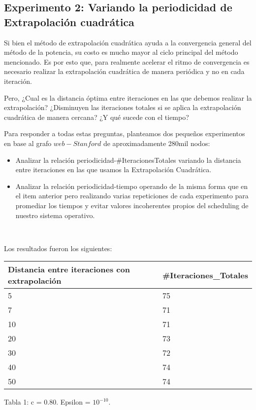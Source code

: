 \subsection{Experimento 2: Variando la periodicidad de Extrapolaci\'on cuadr\'atica}

Si bien el m\'etodo de extrapolaci\'on cuadr\'atica ayuda a la convergencia general del m\'etodo de la potencia, su costo es mucho mayor al ciclo principal del m\'etodo mencionado. Es por esto que, para realmente acelerar el ritmo de convergencia es necesario realizar la extrapolaci\'on cuadr\'atica de manera peri\'odica y no en cada iteraci\'on.

Pero, ¿Cual es la distancia \'optima entre iteraciones en las que debemos realizar la extrapolaci\'on? ¿Disminuyen las iteraciones totales si se aplica la extrapolaci\'on cuadr\'atica de manera cercana? ¿Y qu\'e sucede con el tiempo?

Para responder a todas estas preguntas, planteamos dos pequeños experimentos en base al grafo $web-Stanford$ de aproximadamente 280mil nodos:

\begin{itemize}
	\item Analizar la relaci\'on periodicidad-\#IteracionesTotales variando la distancia entre iteraciones en las que usamos la Extrapolaci\'on Cuadr\'atica.
	\item Analizar la relaci\'on periodicidad-tiempo operando de la misma forma que en el item anterior pero realizando varias repeticiones de cada experimento para promediar los tiempos y evitar valores incoherentes propios del scheduling de nuestro sistema operativo.
\end{itemize}

~

Los resultados fueron los siguientes:

\begin{center}
    \small{
    \begin{tabular}{| l | l |}
    \hline
    Distancia entre iteraciones con extrapolaci\'on & \#Iteraciones\_Totales \\ \hline
    5 & 75 \\ \hline
    7 & 71 \\ \hline
    10 & 71 \\ \hline
    20 & 73 \\ \hline
    30 & 72 \\ \hline
    40 & 74 \\ \hline
    50 & 74 \\ \hline

    \end{tabular}
    }
\end{center}
\begin{center}
Tabla 1: c = 0.80. Epsilon = $10^{-10}$.
\end{center}

